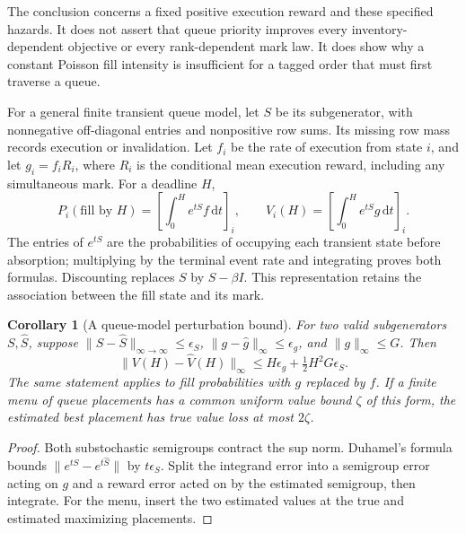 \documentclass[11pt]{article}
\theoremstyle{plain}
\newtheorem{corollary}[theorem]{Corollary}
\theoremstyle{definition}
\theoremstyle{remark}
\newcommand{\dd}{\,\mathrm d}
\newcommand{\norm}[1]{\lVert#1\rVert}
\begin{document}
The conclusion concerns a fixed positive execution reward and these
specified hazards. It does not assert that queue priority improves
every inventory-dependent objective or every rank-dependent mark law.
It does show why a constant Poisson fill intensity is insufficient for
a tagged order that must first traverse a queue.

For a general finite transient queue model, let \(S\) be its
subgenerator, with nonnegative off-diagonal entries and nonpositive
row sums. Its missing row mass records execution or invalidation.
Let \(f_i\) be the rate of execution from state \(i\), and let
\(g_i=f_iR_i\), where \(R_i\) is the conditional mean execution
reward, including any simultaneous mark. For a deadline \(H\),
\begin{equation}\label{eq:queueabsorption}
P_i(\text{fill by }H)=\left[\int_0^H e^{tS}f\dd t\right]_i,
\qquad V_i(H)=\left[\int_0^H e^{tS}g\dd t\right]_i.
\end{equation}
The entries of \(e^{tS}\) are the probabilities of occupying each
transient state before absorption; multiplying by the terminal event
rate and integrating proves both formulas. Discounting replaces
\(S\) by \(S-\beta I\). This representation retains the association
between the fill state and its mark.

\begin{corollary}[A queue-model perturbation bound]
\label{cor:queueperturbation}
For two valid subgenerators \(S,\widehat S\), suppose
\(\norm{S-\widehat S}_{\infty\to\infty}\le\epsilon_S\),
\(\norm{g-\widehat g}_\infty\le\epsilon_g\), and
\(\norm g_\infty\le G\). Then
\[
\norm{V(H)-\widehat V(H)}_\infty
\le H\epsilon_g+\tfrac12H^2G\epsilon_S.
\]
The same statement applies to fill probabilities with \(g\) replaced
by \(f\). If a finite menu of queue placements has a common uniform
value bound \(\zeta\) of this form, the estimated best placement has
true value loss at most \(2\zeta\).
\end{corollary}
\begin{proof}
Both substochastic semigroups contract the sup norm. Duhamel's
formula bounds \(\norm{e^{tS}-e^{t\widehat S}}\) by
\(t\epsilon_S\). Split the integrand error into a semigroup error
acting on \(g\) and a reward error acted on by the estimated
semigroup, then integrate. For the menu, insert the two estimated
values at the true and estimated maximizing placements.
\end{proof}
\end{document}
